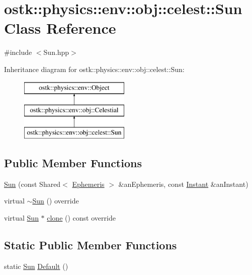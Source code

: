 \hypertarget{classostk_1_1physics_1_1env_1_1obj_1_1celest_1_1_sun}{}\section{ostk\+:\+:physics\+:\+:env\+:\+:obj\+:\+:celest\+:\+:Sun Class Reference}
\label{classostk_1_1physics_1_1env_1_1obj_1_1celest_1_1_sun}


{\ttfamily \#include $<$Sun.\+hpp$>$}

Inheritance diagram for ostk\+:\+:physics\+:\+:env\+:\+:obj\+:\+:celest\+:\+:Sun\+:\begin{figure}[H]
\begin{center}
\leavevmode
\includegraphics[height=3.000000cm]{classostk_1_1physics_1_1env_1_1obj_1_1celest_1_1_sun}
\end{center}
\end{figure}
\subsection*{Public Member Functions}
\begin{DoxyCompactItemize}
\item 
\hyperlink{classostk_1_1physics_1_1env_1_1obj_1_1celest_1_1_sun_ad2301582b97279e3ed9c91bca52a458e}{Sun} (const Shared$<$ \hyperlink{classostk_1_1physics_1_1env_1_1_ephemeris}{Ephemeris} $>$ \&an\+Ephemeris, const \hyperlink{classostk_1_1physics_1_1time_1_1_instant}{Instant} \&an\+Instant)
\item 
virtual \hyperlink{classostk_1_1physics_1_1env_1_1obj_1_1celest_1_1_sun_a1f4396f48b20848291a13f7033a14a58}{$\sim$\+Sun} () override
\item 
virtual \hyperlink{classostk_1_1physics_1_1env_1_1obj_1_1celest_1_1_sun}{Sun} $\ast$ \hyperlink{classostk_1_1physics_1_1env_1_1obj_1_1celest_1_1_sun_a57fd7c3c48115f77e2d3d331ef0e8e0a}{clone} () const override
\end{DoxyCompactItemize}
\subsection*{Static Public Member Functions}
\begin{DoxyCompactItemize}
\item 
static \hyperlink{classostk_1_1physics_1_1env_1_1obj_1_1celest_1_1_sun}{Sun} \hyperlink{classostk_1_1physics_1_1env_1_1obj_1_1celest_1_1_sun_afb5fc16a88e0f2bdbbb977ffb4263dbc}{Default} ()
\end{DoxyCompactItemize}
